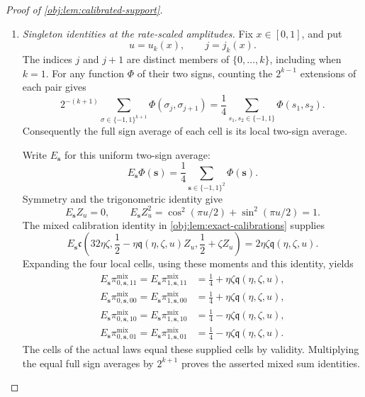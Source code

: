 \documentclass[11pt]{article}
\begin{document}
\begin{proof}[Proof of \cref{obj:lem:calibrated-support}]
\begin{enumerate}
\item \textit{Singleton identities at the rate-scaled amplitudes.}
Fix \(x\in[0,1]\), and put
\[
u=u_k(x),\qquad j=j_k(x).
\]
The indices \(j\) and \(j+1\) are distinct members of \(\{0,\ldots,k\}\), including when \(k=1\). For any function \(\Phi\) of their two signs, counting the \(2^{k-1}\) extensions of each pair gives
\[
2^{-(k+1)}\sum_{\sigma\in\{-1,1\}^{k+1}}
                 \Phi(\sigma_j,\sigma_{j+1})
=\frac14\sum_{s_1,s_2\in\{-1,1\}}\Phi(s_1,s_2).
\]
Consequently the full sign average of each cell is its local two-sign average.

Write \(E_{\mathbf s}\) for this uniform two-sign average:
\[
E_{\mathbf s}\Phi(\mathbf s)
=\frac14\sum_{\mathbf s\in\{-1,1\}^2}\Phi(\mathbf s).
\]
Symmetry and the trigonometric identity give
\[
E_{\mathbf s}Z_u=0,\qquad
E_{\mathbf s}Z_u^2
=\cos^2(\pi u/2)+\sin^2(\pi u/2)=1.
\]
The mixed calibration identity in
\cref{obj:lem:exact-calibrations} supplies
\[
E_{\mathbf s}\mathfrak c\!\left(
32\eta\zeta,\frac12-\eta\mathfrak q(\eta,\zeta,u)Z_u,
                 \frac12+\zeta Z_u\right)
=2\eta\zeta\mathfrak q(\eta,\zeta,u).
\]
Expanding the four local cells, using these moments and this identity, yields
\[
\begin{aligned}
E_{\mathbf s}\pi^{\mathrm{mix}}_{0,\mathbf s,11}
=E_{\mathbf s}\pi^{\mathrm{mix}}_{1,\mathbf s,11}
&=\frac14+\eta\zeta\mathfrak q(\eta,\zeta,u),\\
E_{\mathbf s}\pi^{\mathrm{mix}}_{0,\mathbf s,00}
=E_{\mathbf s}\pi^{\mathrm{mix}}_{1,\mathbf s,00}
&=\frac14+\eta\zeta\mathfrak q(\eta,\zeta,u),\\
E_{\mathbf s}\pi^{\mathrm{mix}}_{0,\mathbf s,10}
=E_{\mathbf s}\pi^{\mathrm{mix}}_{1,\mathbf s,10}
&=\frac14-\eta\zeta\mathfrak q(\eta,\zeta,u),\\
E_{\mathbf s}\pi^{\mathrm{mix}}_{0,\mathbf s,01}
=E_{\mathbf s}\pi^{\mathrm{mix}}_{1,\mathbf s,01}
&=\frac14-\eta\zeta\mathfrak q(\eta,\zeta,u).
\end{aligned}
\]
The cells of the actual laws equal these supplied cells by validity. Multiplying the equal full sign averages by \(2^{k+1}\) proves the asserted mixed sum identities.


\end{enumerate}
\end{proof}
\end{document}
